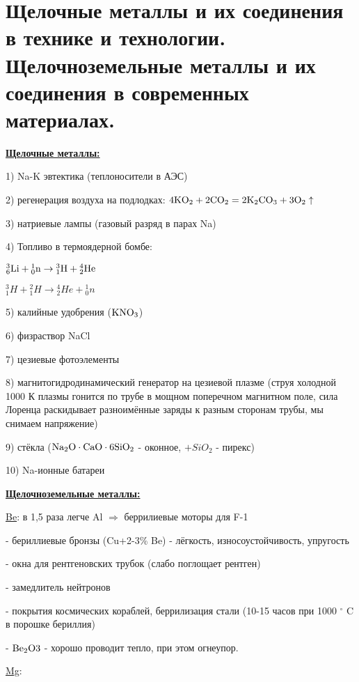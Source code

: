 \section{Щелочные металлы и их соединения в технике и технологии. Щелочноземельные
металлы и их соединения в современных материалах.} %
\underline{\textbf{Щелочные металлы:}}
\par 1) Na-K эвтектика (теплоносители в АЭС)
\par 2) регенерация воздуха на подлодках: $\rm 4KO_2 + 2CO_2 = 2 K_2CO_3 + 3O_2 \uparrow$
\par 3) натриевые лампы (газовый разряд в парах Na)
\par 4) Топливо в термоядерной бомбе: \par $\rm {}_6^3Li + {}_0^1n \rightarrow {}_1^3H+{}_2^4He$ \par ${}_1^3H + {}_1^2H \rightarrow {}_2^4He + {}_0^1n$
\par 5) калийные удобрения ($\rm KNO_3$)
\par 6) физраствор NaCl
\par 7) цезиевые фотоэлементы
\par 8) магнитогидродинамический генератор на цезиевой плазме (струя холодной 1000 К плазмы гонится по трубе в мощном поперечном магнитном поле, сила Лоренца раскидывает разноимённые заряды к разным сторонам трубы, мы снимаем напряжение)
\par 9) стёкла ($\rm Na_2O\cdot CaO \cdot 6SiO_2$ - оконное, $+SiO_2$ - пирекс)
\par10) Na-ионные батареи
\par
\underline{\textbf{Щелочноземельные металлы:}}
\par \underline{Be}: в 1,5 раза легче Al $\Rightarrow$ беррилиевые моторы для F-1
\par - бериллиевые бронзы (Cu+2-3\% Be) - лёгкость, износоустойчивость, упругость
\par - окна для рентгеновских трубок (слабо поглощает рентген)
\par -  замедлитель нейтронов
\par - покрытия космических кораблей, беррилизация стали (10-15 часов при 1000 $^\circ$ C в порошке бериллия)
\par -  $\rm Be_2O3$ - хорошо проводит тепло, при этом огнеупор.
\par \underline{Mg}:
